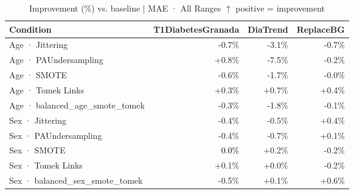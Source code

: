\begin{table}[htbp]
\centering
\small
\caption{Improvement (\%) vs. baseline  |  MAE · All Ranges  $\uparrow$ positive = improvement}
\label{tab:delta_mae_entire_family_mechanism_guided}
\begin{tabular}{lrrr}
\toprule
\textbf{Condition} & \textbf{T1DiabetesGranada} & \textbf{DiaTrend} & \textbf{ReplaceBG} \\
\midrule
Age · Jittering & \textcolor{BrickRed}{-0.7\%} & \textcolor{BrickRed}{-3.1\%} & \textcolor{BrickRed}{-0.7\%} \\
Age · PAUndersampling & \textcolor{OliveGreen}{+0.8\%} & \textcolor{BrickRed}{-7.5\%} & \textcolor{BrickRed}{-0.2\%} \\
Age · SMOTE & \textcolor{BrickRed}{-0.6\%} & \textcolor{BrickRed}{-1.7\%} & \textcolor{BrickRed}{-0.0\%} \\
Age · Tomek Links & \textcolor{OliveGreen}{+0.3\%} & \textcolor{OliveGreen}{+0.7\%} & \textcolor{OliveGreen}{+0.4\%} \\
Age · balanced_age_smote_tomek & \textcolor{BrickRed}{-0.3\%} & \textcolor{BrickRed}{-1.8\%} & \textcolor{BrickRed}{-0.1\%} \\
\midrule
Sex · Jittering & \textcolor{BrickRed}{-0.4\%} & \textcolor{BrickRed}{-0.5\%} & \textcolor{OliveGreen}{+0.4\%} \\
Sex · PAUndersampling & \textcolor{BrickRed}{-0.4\%} & \textcolor{BrickRed}{-0.7\%} & \textcolor{OliveGreen}{+0.1\%} \\
Sex · SMOTE & \textcolor{black}{0.0\%} & \textcolor{OliveGreen}{+0.2\%} & \textcolor{BrickRed}{-0.2\%} \\
Sex · Tomek Links & \textcolor{OliveGreen}{+0.1\%} & \textcolor{OliveGreen}{+0.0\%} & \textcolor{BrickRed}{-0.2\%} \\
Sex · balanced_sex_smote_tomek & \textcolor{BrickRed}{-0.5\%} & \textcolor{OliveGreen}{+0.1\%} & \textcolor{OliveGreen}{+0.6\%} \\
\bottomrule
\end{tabular}
\end{table}